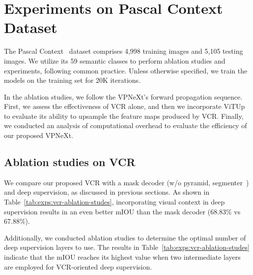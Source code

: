 \section{Experiments on Pascal Context Dataset}
The Pascal Context~\cite{cPascalContext} dataset comprises 4,998 training images and 5,105 testing images. We utilize its 59 semantic classes to perform ablation studies and experiments, following common practice. Unless otherwise specified, we train the models on the training set for 20K iterations.

In the ablation studies, we follow the VPNeXt's forward propagation sequence. 
%
First, we assess the effectiveness of VCR alone, and then we incorporate ViTUp to evaluate its ability to upsample the feature maps produced by VCR.
%
Finally, we conducted an analysis of computational overhead to evaluate the efficiency of our proposed VPNeXt.


\subsection{Ablation studies on VCR}
We compare our proposed VCR with a mask decoder (w/o pyramid, \eg segmenter~\cite{cSegmenter}) and deep supervision, as discussed in previous sections. 
%
As shown in Table~\ref{tab:exps:vcr-ablation-studes}, incorporating visual context in deep supervision results in an even better mIOU than the mask decoder (68.83\% vs 67.88\%). 

Additionally, we conducted ablation studies to determine the optimal number of deep supervision layers to use. 
%
The results in Table~\ref{tab:exps:vcr-ablation-studes} indicate that the mIOU reaches its highest value when two intermediate layers are employed for VCR-oriented deep supervision.


\begin{table}[ht]
    \centering
    \caption{Ablation studies on VCR, all the results are obtained under single-scale without flipping.
    All baseline models are trained using the same backbone and settings.
    \textit{DS:} Deep supervision.
    }
    \label{tab:exps:vcr-ablation-studes}
\end{table}

